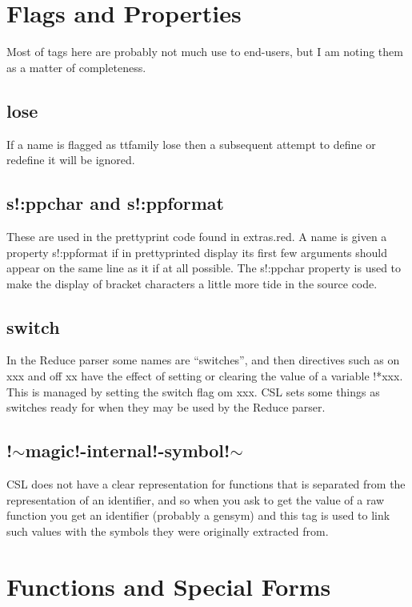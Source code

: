 \documentclass[a4paper,11pt]{article}
\begin{document}
{\section{Flags and Properties}
  
Most of tags here are probably not much use to end-users, but I am noting them
as a matter of completeness.
  

\subsection{\ttfamily lose}
If a name is flagged as {ttfamily lose} then a subsequent attempt to
define or redefine it will be ignored.

\subsection{\ttfamily s!:ppchar and s!:ppformat}
These are used in the prettyprint code found in {\ttfamily extras.red}. A
name is given a property {\ttfamily s!:ppformat} if in prettyprinted display
its first few arguments should appear on the same line as it if at all
possible. The {\ttfamily s!:ppchar} property is used to make the display of
bracket characters a little more tide in the source code.

\subsection{\ttfamily switch}
In the Reduce parser some names are ``switches'', and then directives such
as {\ttfamily on xxx} and {\ttfamily off xx} have the effect of setting or
clearing the value of a variable {\ttfamily !*xxx}. This is managed by
setting the {\ttfamily switch} flag om {\ttfamily xxx}. CSL sets some
things as switches ready for when they may be used by the Reduce parser.

\subsection{\ttfamily !$\sim$magic!-internal!-symbol!$\sim$}
CSL does not have a clear representation for functions that is separated from
the representation of an identifier, and so when you ask to get the value
of a raw function you get an identifier (probably a gensym) and this
tag is used to link such values with the symbols they were originally
extracted from.

\section{Functions and Special Forms}
  
}
\end{document}
